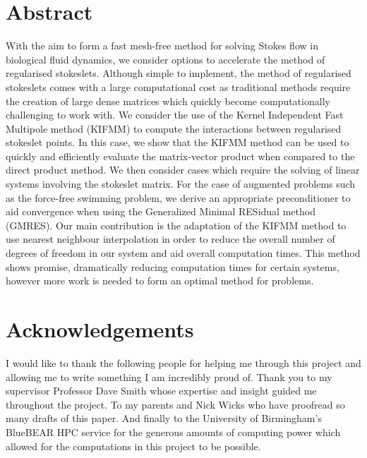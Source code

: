 \documentclass[12pt,twoside,a4paper]{article}
\numberwithin{equation}{section}
\begin{document}


\pagestyle{fancy}
\fancyhf{}
\fancyhead[LE,RO]{\rightmark}
\fancyhead[RE,LO]{\leftmark}
\fancyfoot[C]{\thepage}

\newpage
\section*{Abstract}
With the aim to form a fast mesh-free method for solving Stokes flow in biological fluid dynamics, we consider options to accelerate the method of regularised stokeslets. Although simple to implement, the method of regularised stokeslets comes with a large computational cost as traditional methods require the creation of large dense matrices which quickly become computationally challenging to work with. We consider the use of the Kernel Independent Fast Multipole method (KIFMM) to compute the interactions between regularised stokeslet points. In this case, we show that the KIFMM method can be used to quickly and efficiently evaluate the matrix-vector product when compared to the direct product method. We then consider cases which require the solving of linear systems involving the stokeslet matrix. For the case of augmented problems such as the force-free swimming problem, we derive an appropriate preconditioner to aid convergence when using the Generalized Minimal RESidual method (GMRES). Our main contribution is the adaptation of the KIFMM method to use nearest neighbour interpolation in order to reduce the overall number of degrees of freedom in our system and aid overall computation times. This method shows promise, dramatically reducing computation times for certain systems, however more work is needed to form an optimal method for problems. 

\newpage
\section*{Acknowledgements}
I would like to thank the following people for helping me through this project and allowing me to write something I am incredibly proud of. Thank you to my supervisor Professor Dave Smith whose expertise and insight guided me throughout the project. To my parents and Nick Wicks who have proofread so many drafts of this paper. And finally to the University of Birmingham's BlueBEAR HPC service for the generous amounts of computing power which allowed for the computations in this project to be possible. 


\begin{singlespace}
\pagestyle{contents}
\newpage
{
  \hypersetup{hidelinks}
  \tableofcontents
}

\newpage
\listoffigures
\newpage
\listoftables
\listofalgorithms
\end{singlespace}
\end{document}
